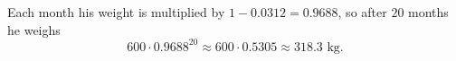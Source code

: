 Each month his weight is multiplied by $1-0.0312=0.9688$, so after $20$ months he weighs
\[600\cdot0.9688^{20}\approx600\cdot0.5305\approx\boxed{318.3\text{ kg}}.\]
